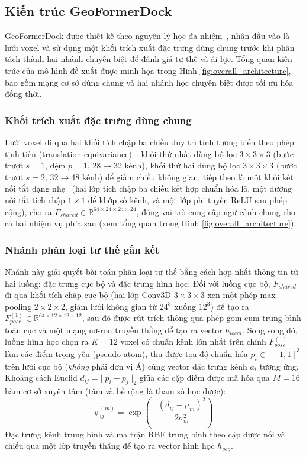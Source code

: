 \subsection{Kiến trúc GeoFormerDock}
GeoFormerDock được thiết kế theo nguyên lý học đa nhiệm~\cite{caruana1997multitask}, nhận đầu vào là lưới voxel và sử dụng một khối trích xuất đặc trưng dùng chung trước khi phân tách thành hai nhánh chuyên biệt để đánh giá tư thế và ái lực. Tổng quan kiến trúc của mô hình đề xuất được minh họa trong Hình \ref{fig:overall_architecture}, bao gồm mạng cơ sở dùng chung và hai nhánh học chuyên biệt được tối ưu hóa đồng thời.

\subsubsection{Khối trích xuất đặc trưng dùng chung}
Lưới voxel đi qua hai khối tích chập ba chiều duy trì tính tương biến theo phép tịnh tiến (translation equivariance)~\cite{ragoza2017protein}: khối thứ nhất dùng bộ lọc $3 \times 3 \times 3$ (bước trượt $s=1$, đệm $p=1$, 28$\to$32 kênh), khối thứ hai dùng bộ lọc $3 \times 3 \times 3$ (bước trượt $s=2$, 32$\to$48 kênh) để giảm chiều không gian, tiếp theo là một khối kết nối tắt dạng nhẹ~\cite{he2016deep} (hai lớp tích chập ba chiều kết hợp chuẩn hóa lô, một đường nối tắt tích chập $1 \times 1$ để khớp số kênh, và một lớp phi tuyến ReLU sau phép cộng), cho ra $F_{shared} \in \mathbb{R}^{64 \times 24 \times 24 \times 24}$, đóng vai trò cung cấp ngữ cảnh chung cho cả hai nhiệm vụ phía sau (xem tổng quan trong Hình \ref{fig:overall_architecture}).

\subsubsection{Nhánh phân loại tư thế gắn kết}
Nhánh này giải quyết bài toán phân loại tư thế bằng cách hợp nhất thông tin từ hai luồng: đặc trưng cục bộ và đặc trưng hình học.
Đối với luồng cục bộ, $F_{shared}$ đi qua khối tích chập cục bộ (hai lớp Conv3D $3\times3\times3$ xen một phép max-pooling $2\times2\times2$, giảm lưới không gian từ $24^3$ xuống $12^3$) để tạo ra $F_{pose}^{(1)} \in \mathbb{R}^{64\times12\times12\times12}$, sau đó được rút trích thông qua phép gom cụm trung bình toàn cục và một mạng nơ-ron truyền thẳng để tạo ra vector $h_{local}$.
Song song đó, luồng hình học chọn ra $K=12$ voxel có chuẩn kênh lớn nhất trên chính $F_{pose}^{(1)}$ làm các điểm trọng yếu (pseudo-atom), thu được tọa độ chuẩn hóa $p_i \in [-1,1]^3$ trên lưới cục bộ (\emph{không} phải đơn vị \AA) cùng vector đặc trưng kênh $a_i$ tương ứng. Khoảng cách Euclid $d_{ij} = ||p_i - p_j||_2$ giữa các cặp điểm được mã hóa qua $M=16$ hàm cơ sở xuyên tâm (tâm và bề rộng là tham số học được):
\begin{equation}
    \psi_{ij}^{(m)} = \exp\left(-\frac{(d_{ij} - \mu_m)^2}{2\sigma_m^2}\right)
    \label{eq:rbf}
\end{equation}
Đặc trưng kênh trung bình và ma trận RBF trung bình theo cặp được nối và chiếu qua một lớp truyền thẳng để tạo ra vector hình học $h_{geo}$.

